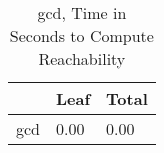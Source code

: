 \begin{table}
\centering
\caption{gcd, Time in Seconds to Compute Reachability}
\label{gcd_states_time}
\begin{tabular}{lll}
\toprule
{} &  Leaf & Total \\
\midrule
gcd &  0.00 &  0.00 \\
\bottomrule
\end{tabular}
\end{table}
